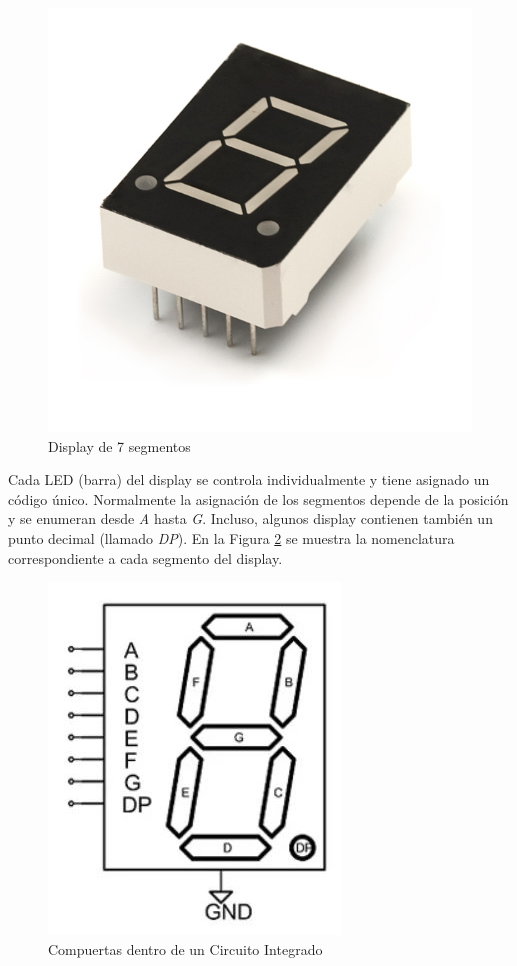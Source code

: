 \begin{figure}[H]
    \centering
    \includegraphics[scale=0.3]{images/7SegmentDisplay.jpg}
    \caption{Display de 7 segmentos}
    \label{Fig:SevenSegment}
\end{figure}

Cada LED (barra) del display se controla individualmente y tiene asignado un código único. Normalmente la asignación de los segmentos
depende de la posición y se enumeran desde \emph{A} hasta \emph{G}. Incluso, algunos display contienen también un punto decimal (llamado \emph{DP}).
En la Figura \ref{Fig:SevenSegments} se muestra la nomenclatura correspondiente a cada segmento del display.


\begin{figure}[H]
    \centering
    \includegraphics[scale=0.8]{images/DisplaySegments.JPG}
    \caption{Compuertas dentro de un Circuito Integrado}
    \label{Fig:SevenSegments}
\end{figure}

